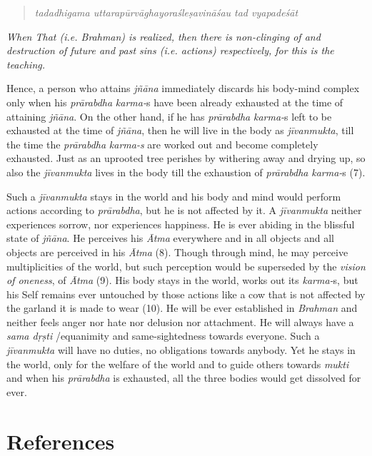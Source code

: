 \begin{verse}
\emph{tadadhigama uttarapūrvāghayoraśleṣavināśau tad vyapadeśāt }
\end{verse}

\emph{When That (i.e. Brahman) is realized, then there is non-clinging of and destruction of future and past sins (i.e. actions) respectively, for this is the teaching.}

Hence, a person who attains \emph{jñāna} immediately discards his body-mind complex only when his \emph{prārabdha} \emph{karma-}s have been already exhausted at the time of attaining \emph{jñāna}. On the other hand, if he has \emph{prārabdha} \emph{karma-}s left to be exhausted at the time of \emph{jñāna}, then he will live in the body as \emph{jīvanmukta}, till the time the \emph{prārabdha} \emph{karma-s} are worked out and become completely exhausted. Just as an uprooted tree perishes by withering away and drying up, so also the \emph{jīvanmukta} lives in the body till the exhaustion of \emph{prārabdha} \emph{karma-}s (7).

Such a \emph{jīvanmukta} stays in the world and his body and mind would perform actions according to \emph{prārabdha}, but he is not affected by it. A \emph{jīvanmukta} neither experiences sorrow, nor experiences happiness. He is ever abiding in the blissful state of \emph{jñāna}. He perceives his \emph{Ātma} everywhere and in all objects and all objects are perceived in his \emph{Ātma} (8). Though through mind, he may perceive multiplicities of the world, but such perception would be superseded by the \emph{vision of oneness}, of \emph{Ātma} (9). His body stays in the world, works out its \emph{karma-}s, but his Self remains ever untouched by those actions like a cow that is not affected by the garland it is made to wear (10). He will be ever established in \emph{Brahman} and neither feels anger nor hate nor delusion nor attachment. He will always have a \emph{sama dṛṣti} /equanimity and same-sightedness towards everyone. Such a \emph{jīvanmukta} will have no duties, no obligations towards anybody. Yet he stays in the world, only for the welfare of the world and to guide others towards \emph{mukti} and when his \emph{prārabdha} is exhausted, all the three bodies would get dissolved for ever.

\section*{References}

